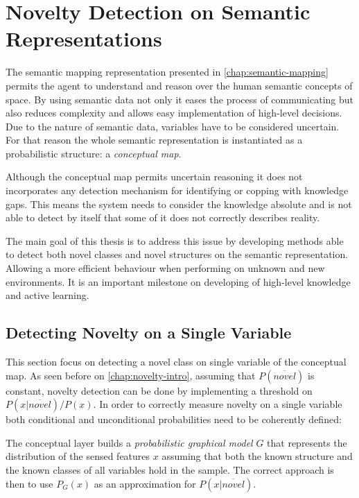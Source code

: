 \chapter{Novelty Detection on Semantic Representations}\label{chap:novelty}
The semantic mapping representation presented in \autoref{chap:semantic-mapping}
permits the agent to understand and reason over the human semantic concepts of
space. By using semantic data not only it eases the process of communicating 
but also reduces complexity and allows easy implementation of high-level
decisions.
Due to the nature of semantic data, variables have to be considered
uncertain. For that reason the whole semantic representation is instantiated
as a probabilistic structure: a \emph{conceptual map}. 

Although the conceptual map permits uncertain reasoning it does not incorporates
any detection mechanism for identifying or copping with knowledge gaps.
This means the system needs to consider the knowledge absolute and is not
able to detect by itself that some of it does not correctly describes reality. 

The main goal of this thesis is to address this issue by developing methods
able to detect both novel classes and novel structures on the semantic
representation. Allowing a more efficient behaviour when performing on unknown
and new environments. It is an important milestone on developing of high-level
knowledge and active learning.


\section{Detecting Novelty on a Single Variable}
This section focus on detecting a novel class on single variable of the
conceptual map. As seen before on \autoref{chap:novelty-intro},
assuming that $P(\overline{novel})$ is constant, novelty detection can be
done by implementing a threshold on $P(x|\overline{novel})/P(x)$.
In order to correctly measure novelty on a single variable both
conditional and unconditional probabilities need to be coherently defined:

The conceptual layer builds a \emph{probabilistic graphical model} $G$ that
represents the distribution of the sensed features $x$ assuming that both the
known structure and the known classes of all variables hold in the sample.
The correct approach is then to use $P_G(x)$ as an approximation for
$P(x|\overline{novel})$.

